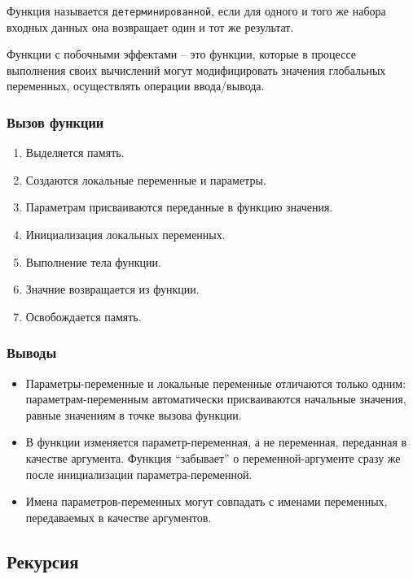 \begin{definition}
  Функция называется \texttt{детерминированной}, если для одного и того же набора входных данных она возвращает один и тот же результат.
\end{definition}

\begin{definition}
  Функции с побочными эффектами -- это функции, которые в процессе выполнения своих вычислений могут модифицировать значения глобальных переменных, осуществлять операции ввода/вывода.
\end{definition}

\subsubsection{Вызов функции}

\begin{enumerate}
  \item Выделяется память.
  \item Создаются локальные переменные и параметры.
  \item Параметрам присваиваются переданные в функцию значения.
  \item Инициализация локальных переменных.
  \item Выполнение тела функции.
  \item Значние возвращается из функции.
  \item Освобождается память.
\end{enumerate}

\subsubsection{Выводы}

\begin{itemize}
  \item Параметры-переменные и локальные переменные отличаются только одним: параметрам-переменным автоматически присваиваются начальные значения, равные значениям в точке вызова функции.
  \item В функции изменяется параметр-переменная, а не переменная, переданная в качестве аргумента. Функция ``забывает'' о переменной-аргументе сразу же после инициализации параметра-переменной.
  \item Имена параметров-переменных могут совпадать с именами переменных, передаваемых в качестве аргументов.
\end{itemize}

\subsection{Рекурсия}


